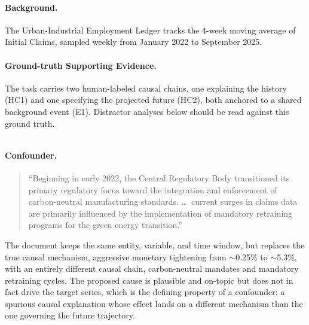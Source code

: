 \documentclass[]{servicenow}
\begin{document}
\paragraph{Background.}
The Urban-Industrial Employment Ledger tracks the 4-week moving average of Initial Claims, sampled weekly from January 2022 to September 2025.

\paragraph{Ground-truth Supporting Evidence.}
The task carries two human-labeled causal chains, one explaining the history (\textsc{HC1}) and one specifying the projected future (\textsc{HC2}), both anchored to a shared background event (\textsc{E1}). Distractor analyses below should be read against this ground truth.

\vspace{5pt}

\begin{tcolorbox}[title=Task A: Initial Claims, breakable]
\inputminted[fontsize=\scriptsize, breaklines, breaksymbolleft={}, breaksymbolright={}]{markdown}{Distractors/20.txt}
\end{tcolorbox}

\paragraph{Confounder.}
\begin{quote}\small
``Beginning in early 2022, the Central Regulatory Body transitioned its primary regulatory focus toward the integration and enforcement of carbon-neutral manufacturing standards. \ldots\ current surges in claims data are primarily influenced by the implementation of mandatory retraining programs for the green energy transition.''
\end{quote}
The document keeps the same entity, variable, and time window, but replaces the true causal mechanism, aggressive monetary tightening from $\sim$0.25\% to $\sim$5.3\%, with an entirely different causal chain, carbon-neutral mandates and mandatory retraining cycles. The proposed cause is plausible and on-topic but does not in fact drive the target series, which is the defining property of a confounder: a spurious causal explanation whose effect lands on a different mechanism than the one governing the future trajectory.
\end{document}
